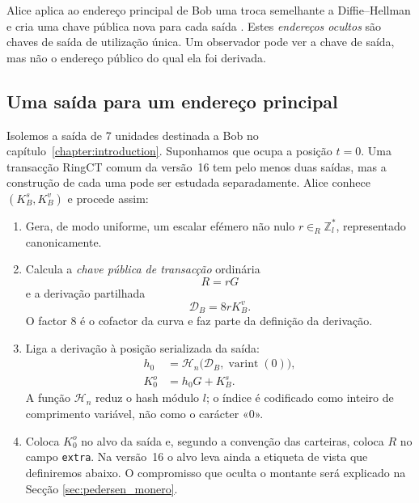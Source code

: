 %
Alice aplica ao endereço principal de Bob uma troca semelhante a Diffie--Hellman
e cria uma chave pública nova para cada saída \cite{cryptoNoteWhitePaper}.
Estes \emph{endereços ocultos} são chaves de saída de utilização única.
Um observador pode ver a chave de
saída, mas não o endereço público do qual ela foi derivada.

\subsection*{Uma saída para um endereço principal}

Isolemos a saída de 7 unidades destinada a Bob no capítulo~\ref{chapter:introduction}. Suponhamos que ocupa a posição \(t=0\).
Uma transacção RingCT comum da versão~16 tem pelo menos duas saídas, mas a
construção de cada uma pode ser estudada separadamente. Alice conhece
\((K_B^s,K_B^v)\) e procede assim:

\begin{enumerate}
 \item Gera, de modo uniforme, um escalar efémero não nulo
 \(r\in_R\mathbb{Z}_l^*\), representado canonicamente.

 \item Calcula a \emph{chave pública de transacção} ordinária
 \[
  R=rG
 \]
 e a derivação partilhada
 \[
  \mathcal D_B=8rK_B^v.
 \]
 O factor 8 é o cofactor da curva e faz parte da definição da derivação.

 \item Liga a derivação à posição serializada da saída:
 \begin{align*}
  h_0&=\mathcal H_n\bigl(\mathcal D_B,
             \operatorname{varint}(0)\bigr),\\
  K_0^o&=h_0G+K_B^s.
 \end{align*}
 A função \(\mathcal H_n\) reduz o hash módulo \(l\); o índice é codificado
 como inteiro de comprimento variável, não como o carácter «0».

 \item Coloca \(K_0^o\) no alvo da saída e, segundo a convenção das carteiras,
 coloca \(R\) no campo \texttt{extra}. Na versão~16 o alvo leva ainda a
 etiqueta de vista que definiremos abaixo. O compromisso que oculta o
 montante será explicado na Secção \ref{sec:pedersen_monero}.
\end{enumerate}


